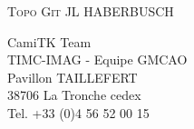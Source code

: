 \begin{titlepage}
 
    \begin{center}
        \vspace*{10cm}
        \textsc{\LARGE{Topo Git}}
        \HRule
        \vspace*{0.5cm}
        \large{JL HABERBUSCH} 
    \end{center}
 
    \vspace*{4cm}
    \begin{center}
    \end{center}
    \vspace*{0.2cm}
 
    \begin{flushright}
        CamiTK Team\\
        TIMC-IMAG - Equipe GMCAO\\
        Pavillon TAILLEFERT\\
        38706 La Tronche cedex\\
        Tel. +33 (0)4 56 52 00 15 \\
    \end{flushright}
\end{titlepage}
\ClearShipoutPicture